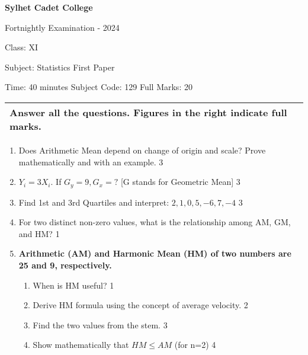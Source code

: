 \documentclass[10pt]{article}
\begin{document}
\begin{center}
  \bfseries\large
  Sylhet Cadet College

\normalsize
Fortnightly Examination - 2024

  Class: XI

  Subject: Statistics First Paper

  Time: 40 minutes \qquad \qquad  \qquad \qquad Subject Code: 129  \qquad  \qquad \qquad  \qquad Full Marks: 20

\end{center}

\noindent
\begin{tabular}{p{\dimexpr\linewidth-2\tabcolsep}}
  \textbf{Answer all the questions. Figures in the right indicate full marks.}\\
  \hline
\end{tabular}

\begin{enumerate}

  \item Does Arithmetic Mean depend on change of origin and scale? Prove mathematically and with an example. \hfill 3

 \item $Y_i = 3X_i$. If $G_y = 9, G_x=?$ [G stands for Geometric Mean] \hfill 3
 
 \item Find 1st and 3rd Quartiles and interpret: $2,1,0,5,-6,7,-4$ \hfill 3
 
 \item For two distinct non-zero values, what is the relationship among AM, GM, and HM? \hfill 1
 
\item
	  \textbf{Arithmetic (AM) and Harmonic Mean (HM) of two numbers are 25 and 9, respectively.} 
    \begin{enumerate}
    \item
	When is HM useful? \hfill 1
    \item
	Derive HM formula using the concept of average velocity. \hfill 2
    \item  
	Find the two values from the stem. \hfill 3
    \item
	Show mathematically that $HM \le AM$ (for n=2) \hfill 4
  \end{enumerate}

\end{enumerate}

\vspace{0.5in}
\end{document}
